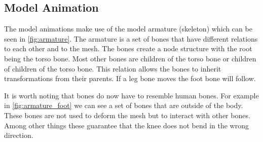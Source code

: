 \subsection{Model Animation} \label{sec:theory_theory_models_animation}
The model animations make use of the model armature (skeleton) which can be seen in \autoref{fig:armature}.
The armature is a set of bones that have different relations to each other and to the mesh.
The bones create a node structure with the root being the torso bone.
Most other bones are children of the torso bone or children of children of the torso bone.
This relation allows the bones to inherit transformations from their parents.
If a leg bone moves the foot bone will follow. 

It is worth noting that bones do now have to resemble human bones.
For example in \autoref{fig:armature_foot} we can see a set of bones that are outside of the body.
These bones are not used to deform the mesh but to interact with other bones.
Among other things these guarantee that the knee does not bend in the wrong direction.


